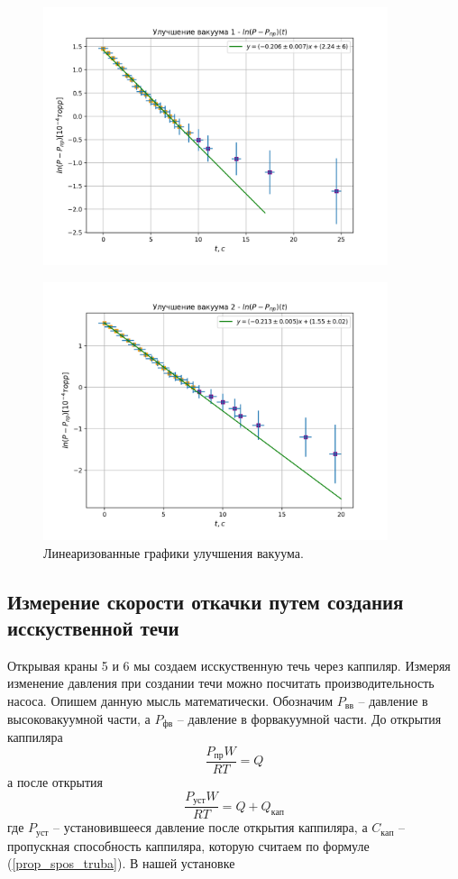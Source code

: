 \documentclass{article}
\begin{document}
    \begin{figure}[h]
        \centerline{\includegraphics[width=0.9\textwidth]{ccum_1}}
    \end{figure}
    \begin{figure}[h]
        \centerline{\includegraphics[width=0.9\textwidth]{ccum_2}}
        \caption{Линеаризованные графики улучшения вакуума.}
        \label{ris:ccum}
    \end{figure}

    \newpage

    \subsection{Измерение скорости откачки путем создания исскуственной течи}
    Открывая краны 5 и 6 мы создаем исскуственную течь через каппиляр. Измеряя изменение давления при создании течи можно посчитать производительность насоса. Опишем данную мысль математически. Обозначим $P_{вв}$ -- давление в высоковакуумной части, а $P_{фв}$ -- давление в форвакуумной части. До открытия каппиляра
    \begin{equation}
        \frac{P_{пр}W}{RT} = Q
    \end{equation}
    а после открытия
    \begin{equation}
        \frac{P_{уст}W}{RT} = Q + Q_{кап}
    \end{equation}
    где $P_{уст}$ -- установившееся давление после открытия каппиляра, а $C_{кап}$ -- пропускная способность каппиляра, которую считаем по формуле (\ref{prop_spos_truba}). В нашей установке
\end{document}
